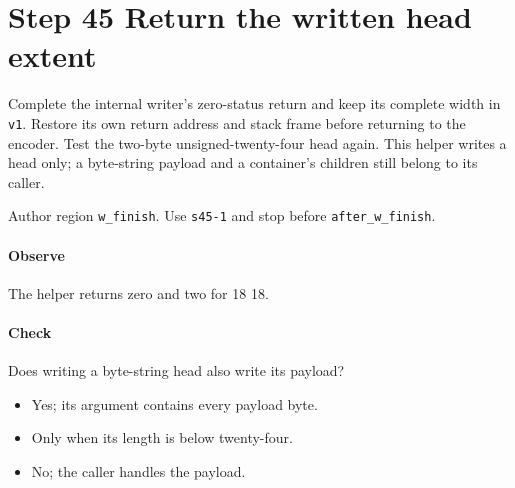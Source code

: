 \section{Step 45 Return the written head extent}\label{cbor-s45}
Complete the internal writer's zero-status return and keep its complete width in \texttt{v1}. Restore its own return address and stack frame before returning to the encoder. Test the two-byte unsigned-twenty-four head again. This helper writes a head only; a byte-string payload and a container's children still belong to its caller.

Author region \texttt{w\_finish}. Use \texttt{s45-1} and stop before \texttt{after\_w\_finish}.

\paragraph{Observe} The helper returns zero and two for 18 18.

\paragraph{Check} Does writing a byte-string head also write its payload?
\begin{itemize}
\item[A.] Yes; its argument contains every payload byte.
\item[B.] Only when its length is below twenty-four.
\item[C.] No; the caller handles the payload.
\end{itemize}
